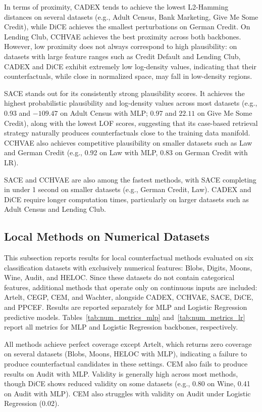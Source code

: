 \documentclass[runningheads]{llncs}
\begin{document}
In terms of proximity, CADEX tends to achieve the lowest L2-Hamming distances on several datasets (e.g., Adult Census, Bank Marketing, Give Me Some Credit), while DiCE achieves the smallest perturbations on German Credit. On Lending Club, CCHVAE achieves the best proximity across both backbones. However, low proximity does not always correspond to high plausibility: on datasets with large feature ranges such as Credit Default and Lending Club, CADEX and DiCE exhibit extremely low log-density values, indicating that their counterfactuals, while close in normalized space, may fall in low-density regions.

SACE stands out for its consistently strong plausibility scores. It achieves the highest probabilistic plausibility and log-density values across most datasets (e.g., 0.93 and $-109.47$ on Adult Census with MLP; 0.97 and $22.11$ on Give Me Some Credit), along with the lowest LOF scores, suggesting that its case-based retrieval strategy naturally produces counterfactuals close to the training data manifold. CCHVAE also achieves competitive plausibility on smaller datasets such as Law and German Credit (e.g., 0.92 on Law with MLP, 0.83 on German Credit with LR).

SACE and CCHVAE are also among the fastest methods, with SACE completing in under 1 second on smaller datasets (e.g., German Credit, Law). CADEX and DiCE require longer computation times, particularly on larger datasets such as Adult Census and Lending Club.



\subsection{Local Methods on Numerical Datasets}

This subsection reports results for local counterfactual methods evaluated on six classification datasets with exclusively numerical features: Blobs, Digits, Moons, Wine, Audit, and HELOC. Since these datasets do not contain categorical features, additional methods that operate only on continuous inputs are included: Artelt, CEGP, CEM, and Wachter, alongside CADEX, CCHVAE, SACE, DiCE, and PPCEF. Results are reported separately for MLP and Logistic Regression predictive models. Tables~\ref{tab:num_metrics_mlp} and~\ref{tab:num_metrics_lr} report all metrics for MLP and Logistic Regression backbones, respectively.

All methods achieve perfect coverage except Artelt, which returns zero coverage on several datasets (Blobs, Moons, HELOC with MLP), indicating a failure to produce counterfactual candidates in these settings. CEM also fails to produce results on Audit with MLP. Validity is generally high across most methods, though DiCE shows reduced validity on some datasets (e.g., 0.80 on Wine, 0.41 on Audit with MLP). CEM also struggles with validity on Audit under Logistic Regression (0.02).
\end{document}
